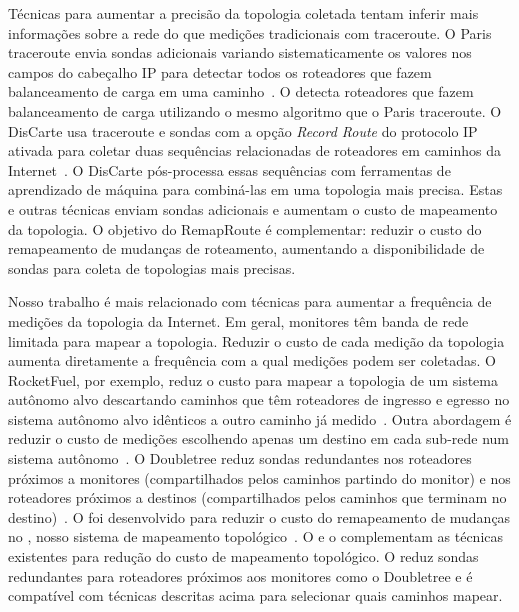 Técnicas para aumentar a precisão da topologia coletada tentam inferir
mais informações sobre a rede do que medições tradicionais com
traceroute.  O Paris traceroute envia sondas adicionais variando
sistematicamente os valores nos campos do cabeçalho IP para detectar
todos os roteadores que fazem balanceamento de carga em uma
caminho~\cite{augustin07, veitch09balancer}.  O \rmprt{} detecta
roteadores que fazem balanceamento de carga utilizando o mesmo algoritmo
que o Paris traceroute.  O DisCarte usa traceroute e sondas com a opção
\emph{Record Route} do protocolo IP ativada para coletar duas sequências
relacionadas de roteadores em caminhos da
Internet~\cite{sherwood08discarte}.  O DisCarte pós-processa essas
sequências com ferramentas de aprendizado de máquina para combiná-las em
uma topologia mais precisa.  Estas e outras técnicas enviam sondas
adicionais e aumentam o custo de mapeamento da topologia.  O objetivo do
RemapRoute é complementar: reduzir o custo do remapeamento de mudanças
de roteamento, aumentando a disponibilidade de sondas para coleta de
topologias mais precisas.  


Nosso trabalho é mais relacionado com técnicas para aumentar a
frequência de medições da topologia da Internet.  Em geral, monitores
têm banda de rede limitada para mapear a topologia.  Reduzir o custo de
cada medição da topologia aumenta diretamente a frequência com a qual
medições podem ser coletadas.  O RocketFuel, por exemplo, reduz o custo
para mapear a topologia de um sistema autônomo alvo descartando caminhos
que têm roteadores de ingresso e egresso no sistema autônomo alvo
idênticos a outro caminho já medido~\cite{spring02rocketfuel}.  Outra
abordagem é reduzir o custo de medições escolhendo apenas um destino em
cada sub-rede num sistema autônomo~\cite{beverly10hifreq}.  O Doubletree
reduz sondas redundantes nos roteadores próximos a monitores
(compartilhados pelos caminhos partindo do monitor) e nos roteadores
próximos a destinos (compartilhados pelos caminhos que terminam no
destino)~\cite{donnet05topology}.  O \rmprt{} foi desenvolvido para
reduzir o custo do remapeamento de mudanças no \dtrack{}, nosso sistema
de mapeamento topológico~\cite{cunha11dtrack}.  O \rmprt{} e o \dtrack{}
complementam as técnicas existentes para redução do custo de mapeamento
topológico.  O \dtrack{} reduz sondas redundantes para roteadores
próximos aos monitores como o Doubletree e é compatível com técnicas
descritas acima para selecionar quais caminhos mapear.
